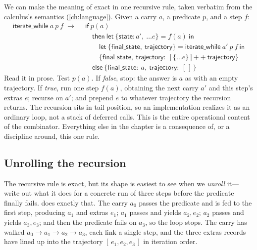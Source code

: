 We can make the meaning of  exact in one recursive rule,
taken verbatim from the calculus's semantics (\cref{ch:language}). Given a carry
$a$, a predicate $p$, and a step $f$:
\[
\begin{aligned}
\textsf{iterate\_while}\ a\ p\ f \;\to\;\ &\textsf{if}\ p(a)\\
  &\quad\textsf{then}\ \textsf{let}\ \{\textsf{state}\!:\!a',\ \dots e\} = f(a)\ \textsf{in}\\
  &\qquad \textsf{let}\ \{\textsf{final\_state},\ \textsf{trajectory}\} = \textsf{iterate\_while}\ a'\ p\ f\ \textsf{in}\\
  &\qquad \{\textsf{final\_state},\ \textsf{trajectory}\!:\ [\{\dots e\}] \mathbin{+\!\!+} \textsf{trajectory}\}\\
  &\quad\textsf{else}\ \{\textsf{final\_state}\!:\ a,\ \textsf{trajectory}\!:\ [\,]\,\}
\end{aligned}
\]
Read it in prose. Test $p(a)$. If \emph{false}, stop: the answer is $a$ as
 with an empty trajectory. If \emph{true}, run one step
$f(a)$, obtaining the next carry $a'$ and this step's extras $e$; recurse on
$a'$; and prepend $e$ to whatever trajectory the recursion returns. The recursion
sits in tail position, so an implementation realizes it as an ordinary loop, not
a stack of deferred calls. This is the entire operational content of the
combinator. Everything else in the chapter is a consequence of, or a discipline
around, this one rule.

\subsection{Unrolling the recursion}

The recursive rule is exact, but its shape is easiest to see when we
\emph{unroll} it---write out what it does for a concrete run of three steps
before the predicate finally fails.  does exactly that. The
carry $a_0$ passes the predicate and is fed to the first step, producing $a_1$
and extras $e_1$; $a_1$ passes and yields $a_2, e_2$; $a_2$ passes and yields
$a_3, e_3$; and then the predicate fails on $a_3$, so the loop stops. The carry
has walked $a_0 \to a_1 \to a_2 \to a_3$, each link a single step, and the three
extras records have lined up into the trajectory
$[\,e_1, e_2, e_3\,]$ in iteration order.

